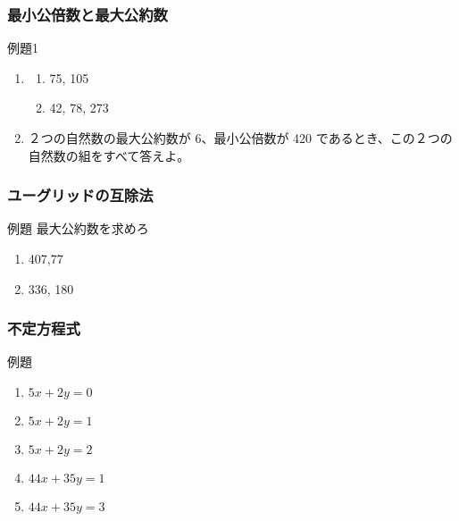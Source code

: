 \documentclass[10pt,dvipdfmx]{jsarticle}
\begin{document}
\subsubsection*{最小公倍数と最大公約数}
\begin{itembox}[l]{例題1}
  \begin{enumerate}
    \item \begin{multicols}{2}
            \begin{large}
              \begin{enumerate}
                \item 75, 105
                \item 42, 78, 273
              \end{enumerate}
            \end{large}
          \end{multicols}
    \item
          ２つの自然数の最大公約数が 6、最小公倍数が 420 であるとき、この２つの自然数の組をすべて答えよ。
  \end{enumerate}
  \vspace{10mm}
\end{itembox}

\subsubsection*{ユーグリッドの互除法}
\begin{itembox}[l]{例題 最大公約数を求めろ}
  \begin{large}
    \begin{enumerate}
      \item 407,77
      \item 336, 180
    \end{enumerate}
  \end{large}
\end{itembox}

\subsubsection*{不定方程式}
\begin{itembox}[l]{例題}
  \begin{large}
    \begin{enumerate}
      \item $5x+2y=0$
      \item $5x+2y=1$
      \item $5x+2y=2$
      \item $44x+35y=1$
      \item $44x+35y=3$
    \end{enumerate}
  \end{large}
\end{itembox}
\end{document}
